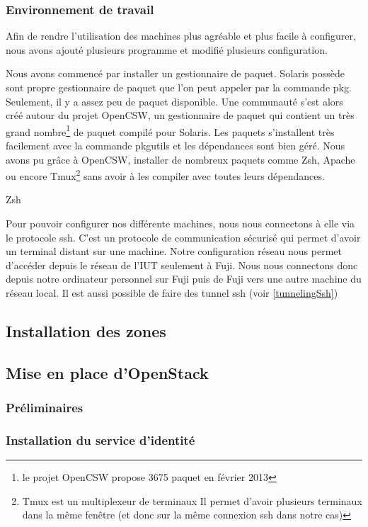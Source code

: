 \documentclass[a4paper,oneside]{report}
\begin{document}
\subsubsection{Environnement de travail}
Afin de rendre l'utilisation des machines plus agréable et plus facile à configurer, nous avons ajouté plusieurs programme et modifié plusieurs configuration.

Nous avons commencé par installer un gestionnaire de paquet.
Solaris possède sont propre gestionnaire de paquet que l'on peut appeler par la commande pkg. Seulement, il y a assez peu de paquet disponible.
Une communauté s'est alors créé autour du projet OpenCSW, un gestionnaire de paquet qui contient un très grand nombre\footnote{le projet OpenCSW propose 3675 paquet en février 2013} de paquet compilé pour Solaris.
Les paquets s'installent très facilement avec la commande pkgutils et les dépendances sont bien géré. Nous avons pu grâce à OpenCSW, installer de nombreux paquets comme Zsh, Apache ou encore Tmux\footnote{Tmux est un multiplexeur de terminaux
Il permet d'avoir plusieurs terminaux dans la même fenêtre (et donc sur la même connexion \gls{ssh} dans notre cas)} sans avoir à les compiler avec toutes leurs dépendances. 


Zsh


Pour pouvoir configurer nos différente machines, nous nous connectons à elle via le protocole \gls{ssh}. 
C'est un protocole de communication sécurisé qui permet d'avoir un terminal distant sur une machine.
Notre configuration réseau nous permet d'accéder depuis le réseau de l'IUT seulement à Fuji.
Nous nous connectons donc depuis notre ordinateur personnel sur Fuji puis de Fuji vers une autre machine du réseau local.
Il est aussi possible de faire des tunnel \gls{ssh} (voir \ref{tunnelingSsh})

\subsection{Installation des zones}

\subsection{Mise en place d'OpenStack}
\subsubsection{Préliminaires}

\subsubsection{Installation du service d'identité}
\end{document}
